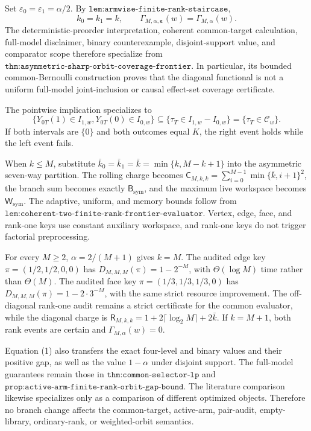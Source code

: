 Set \(\varepsilon_0=\varepsilon_1=\alpha/2\). By \(\texttt{lem:armwise-finite-rank-staircase}\),
\[
k_0=k_1=k,\qquad \Gamma_{M,\alpha,\boldsymbol\varepsilon}(w)=\Gamma_{M,\alpha}(w).
\tag{1}
\]
The deterministic-preorder interpretation, coherent common-target calculation, full-model disclaimer, binary counterexample, disjoint-support value, and comparator scope therefore specialize from \(\texttt{thm:asymmetric-sharp-orbit-coverage-frontier}\). In particular, its bounded common-Bernoulli construction proves that the diagonal functional is not a uniform full-model joint-inclusion or causal effect-set coverage certificate.

The pointwise implication specializes to
\[
\{Y_{0T}(1)\in I_{1,w},Y_{0T}(0)\in I_{0,w}\}\subseteq\{\tau_T\in I_{1,w}-I_{0,w}\}=\{\tau_T\in\mathcal C_w\}.
\tag{2}
\]
If both intervals are \(\{0\}\) and both outcomes equal \(K\), the right event holds while the left event fails.

When \(k\le M\), substitute \(\bar k_0=\bar k_1=\bar k=\min\{k,M-k+1\}\) into the asymmetric seven-way partition. The rolling charge becomes \(\mathsf C_{M,k,k}=\sum_{i=0}^{M-1}\min\{\bar k,i+1\}^2\), the branch sum becomes exactly \(\mathsf B_{\mathrm{sym}}\), and the maximum live workspace becomes \(\mathsf W_{\mathrm{sym}}\). The adaptive, uniform, and memory bounds follow from \(\texttt{lem:coherent-two-finite-rank-frontier-evaluator}\). Vertex, edge, face, and rank-one keys use constant auxiliary workspace, and rank-one keys do not trigger factorial preprocessing.

For every \(M\ge2\), \(\alpha=2/(M+1)\) gives \(k=M\). The audited edge key \(\pi=(1/2,1/2,0,0)\) has \(D_{M,M,M}(\pi)=1-2^{-M}\), with \(\Theta(\log M)\) time rather than \(\Theta(M)\). The audited face key \(\pi=(1/3,1/3,1/3,0)\) has \(D_{M,M,M}(\pi)=1-2\cdot3^{-M}\), with the same strict resource improvement. The off-diagonal rank-one audit remains a strict certificate for the common evaluator, while the diagonal charge is \(\mathsf R_{M,k,k}=1+2\lceil\log_2M\rceil+2\bar k\). If \(k=M+1\), both rank events are certain and \(\Gamma_{M,\alpha}(w)=0\).

Equation (1) also transfers the exact four-level and binary values and their positive gap, as well as the value \(1-\alpha\) under disjoint support. The full-model guarantees remain those in \(\texttt{thm:common-selector-lp}\) and \(\texttt{prop:active-arm-finite-rank-orbit-gap-bound}\). The literature comparison likewise specializes only as a comparison of different optimized objects. Therefore no branch change affects the common-target, active-arm, pair-audit, empty-library, ordinary-rank, or weighted-orbit semantics.
